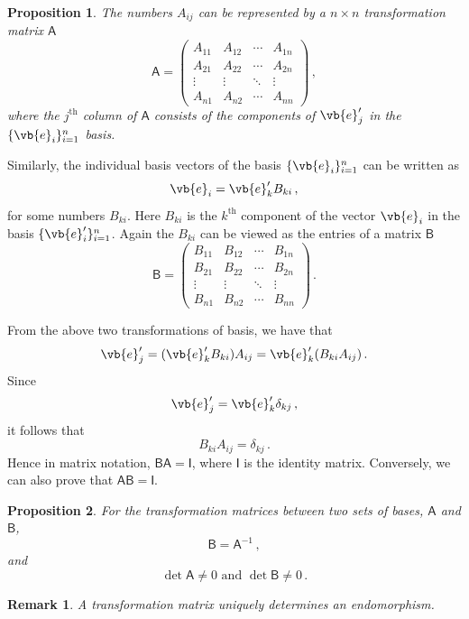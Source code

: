 \documentclass{article}
\theoremstyle{plain}\theoremheaderfont{\normalfont\itshape}\theorembodyfont{\rmfamily}\theoremseparator{.}\newtheorem*{rem}{Remark}\newtheorem*{ex}{Example}\newtheorem*{proof}{Proof}\newtheorem*{altp}{Alternative proof}
\theoremstyle{plain}\theoremheaderfont{\normalfont\bfseries}\theorembodyfont{\rmfamily}\theoremseparator{.}\newtheorem{thm}{Theorem}[section]\newtheorem{lem}[thm]{Lemma}\newtheorem{prop}[thm]{Proposition}\newtheorem*{cor}{Corollary}\newtheorem{defn}[thm]{Definition}\newtheorem{clm}[thm]{Claim}\newtheorem{clminproof}{Claim}
\theoremstyle{break}\theoremheaderfont{\normalfont\itshape}\theorembodyfont{\rmfamily}\theoremseparator{.\medskip}\newtheorem*{proofskip}{Proof}\newtheorem*{exs}{Examples}\newtheorem*{rems}{Remarks}
\theoremstyle{break}\theoremheaderfont{\normalfont\bfseries}\theorembodyfont{\rmfamily}\theoremseparator{.\medskip}\newtheorem{lemskip}[thm]{Lemma}\newtheorem{defnskip}[thm]{Definition}\newtheorem{propskip}[thm]{Proposition}\newtheorem{thmskip}[thm]{Theorem}
\numberwithin{equation}{section}
\begin{document}
	\begin{prop}
		The numbers \(A_{ij}\) can be represented by a \(n\times n\) transformation matrix \(\mathsf{A}\)
		\[\mathsf{A}=\begin{pmatrix}
			A_{11} & A_{12} & \cdots & A_{1n}\\
			A_{21} & A_{22} & \cdots & A_{2n}\\
			\vdots & \vdots & \ddots & \vdots\\
			A_{n1} & A_{n2} & \cdots & A_{nn}
		\end{pmatrix}\,,\]
		where the \(j^{\text{th}}\) column of \(\mathsf{A}\) consists of the components of \(\vb{e}'_j\) in the \(\{\vb{e}_i\}_{i=1}^n\) basis.
	\end{prop}
	
	Similarly, the individual basis vectors of the basis \(\{\vb{e}_i\}_{i=1}^n\) can be written as
	\[\vb{e}_i=\vb{e}'_kB_{ki}\,,\]
	for some numbers \(B_{ki}\). Here \(B_{ki}\) is the \(k^{\text{th}}\) component of the vector \(\vb{e}_i\) in the basis \(\{\vb{e}'_i\}_{i=1}^n\). Again the \(B_{ki}\) can be viewed as the entries of a matrix \(\mathsf{B}\)
	\[\mathsf{B}=\begin{pmatrix}
		B_{11} & B_{12} & \cdots & B_{1n}\\
		B_{21} & B_{22} & \cdots & B_{2n}\\
		\vdots & \vdots & \ddots & \vdots\\
		B_{n1} & B_{n2} & \cdots & B_{nn}
	\end{pmatrix}\,.\]
	
	From the above two transformations of basis, we have that
	\[\vb{e}'_j=(\vb{e}'_kB_{ki})A_{ij}=\vb{e}'_k(B_{ki}A_{ij})\,.\]
	Since
	\[\vb{e}'_j=\vb{e}'_k\delta_{kj}\,,\]
	it follows that
	\[B_{ki}A_{ij}=\delta_{kj}\,.\]
	Hence in matrix notation, \(\mathsf{BA}=\mathsf{I}\), where \(\mathsf{I}\) is the identity matrix. Conversely, we can also prove that \(\mathsf{AB}=\mathsf{I}\).
	\begin{prop}
		For the transformation matrices between two sets of bases, \(\mathsf{A}\) and \(\mathsf{B}\),
		\[\mathsf{B}=\mathsf{A}^{-1}\,,\]
		and
		\[\det\mathsf{A}\ne 0\text{ and }\det\mathsf{B}\ne 0\,.\]
	\end{prop}
	\begin{rem}
		A transformation matrix uniquely determines an endomorphism.
	\end{rem}
\end{document}

